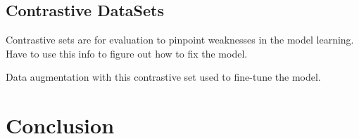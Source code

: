 \documentclass{article}
\begin{document}
\begin{multicols*}{2}
\subsection{Contrastive DataSets}

Contrastive sets are for evaluation to pinpoint weaknesses in the model learning. Have to use this info to figure out how to fix the model.

Data augmentation with this contrastive set used to fine-tune the model.


\section{Conclusion}



\end{multicols*}
\end{document}
